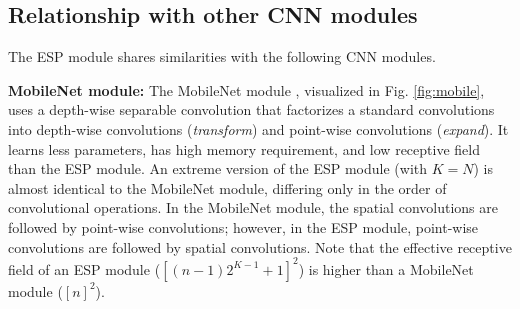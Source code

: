 \documentclass[runningheads]{llncs}
\def\Fig{Fig. }
\begin{document}
\subsection{Relationship with other CNN modules}
\label{ssec:relationship}
The ESP module shares similarities with the following CNN modules.

\noindent \textbf{MobileNet module:} The MobileNet module \cite{howard2017mobilenets}, visualized in  \Fig \ref{fig:mobile}, uses a depth-wise separable convolution \cite{chollet2016xception} that factorizes a standard convolutions into depth-wise convolutions (\textit{transform}) and point-wise convolutions (\textit{expand}). It learns less parameters, has high memory requirement, and low receptive field than the ESP module. 
An extreme version of the ESP module (with $K=N$) is almost identical to the MobileNet module, differing only in the order of convolutional operations. In the MobileNet module, the spatial convolutions are followed by point-wise convolutions; however, in the ESP module, point-wise convolutions are followed by spatial convolutions. Note that the effective receptive field of an ESP module ($\left[ (n-1) 2^{K-1} + 1 \right]^2$) is higher than a MobileNet module ($\left[n \right]^2$).
\end{document}
